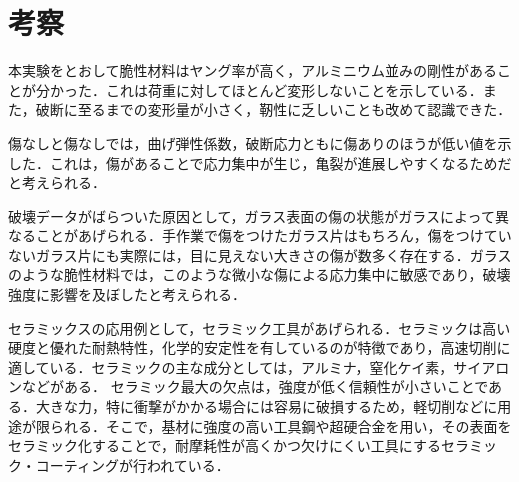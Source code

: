 \section{考察}
本実験をとおして脆性材料はヤング率が高く，アルミニウム並みの剛性があることが分かった．これは荷重に対してほとんど変形しないことを示している．また，破断に至るまでの変形量が小さく，靭性に乏しいことも改めて認識できた．

傷なしと傷なしでは，曲げ弾性係数，破断応力ともに傷ありのほうが低い値を示した．これは，傷があることで応力集中が生じ，亀裂が進展しやすくなるためだと考えられる．

破壊データがばらついた原因として，ガラス表面の傷の状態がガラスによって異なることがあげられる．手作業で傷をつけたガラス片はもちろん，傷をつけていないガラス片にも実際には，目に見えない大きさの傷が数多く存在する．ガラスのような脆性材料では，このような微小な傷による応力集中に敏感であり，破壊強度に影響を及ぼしたと考えられる．

セラミックスの応用例として，セラミック工具があげられる．セラミックは高い硬度と優れた耐熱特性，化学的安定性を有しているのが特徴であり，高速切削に適している．セラミックの主な成分としては，アルミナ，窒化ケイ素，サイアロンなどがある．
セラミック最大の欠点は，強度が低く信頼性が小さいことである．大きな力，特に衝撃がかかる場合には容易に破損するため，軽切削などに用途が限られる．そこで，基材に強度の高い工具鋼や超硬合金を用い，その表面をセラミック化することで，耐摩耗性が高くかつ欠けにくい工具にするセラミック・コーティングが行われている．